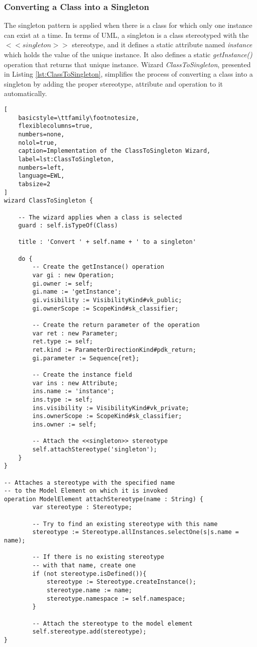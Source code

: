 \subsubsection{Converting a Class into a Singleton}
\label{sec:ClassToSingleton}

The singleton pattern \cite{Larman} is applied when there is a class for which only one instance can exist at a time. In terms of UML, a singleton is a class stereotyped with the $<<singleton>>$ stereotype, and it defines a static attribute named \emph{instance} which holds the value of the unique instance. It also defines a static \emph{getInstance()} operation that returns that unique instance. Wizard \emph{ClassToSingleton}, presented in Listing \ref{lst:ClassToSingleton}, simplifies the process of converting a class into a singleton by adding the proper stereotype, attribute and operation to it automatically.

\begin{lstlisting}[
	basicstyle=\ttfamily\footnotesize, 
	flexiblecolumns=true,
	numbers=none,
	nolol=true,
	caption=Implementation of the ClassToSingleton Wizard, 
	label=lst:ClassToSingleton,
	numbers=left,
	language=EWL,
	tabsize=2
]
wizard ClassToSingleton {
	
	-- The wizard applies when a class is selected
	guard : self.isTypeOf(Class)
	
	title : 'Convert ' + self.name + ' to a singleton'
	
	do {
		-- Create the getInstance() operation 
		var gi : new Operation; 
		gi.owner := self; 
		gi.name := 'getInstance'; 
		gi.visibility := VisibilityKind#vk_public; 
		gi.ownerScope := ScopeKind#sk_classifier; 
		
		-- Create the return parameter of the operation 
		var ret : new Parameter; 
		ret.type := self; 
		ret.kind := ParameterDirectionKind#pdk_return; 
		gi.parameter := Sequence{ret}; 
		
		-- Create the instance field 
		var ins : new Attribute; 
		ins.name := 'instance'; 
		ins.type := self; 
		ins.visibility := VisibilityKind#vk_private; 
		ins.ownerScope := ScopeKind#sk_classifier; 
		ins.owner := self; 
		
		-- Attach the <<singleton>> stereotype 
		self.attachStereotype('singleton');
	}
}

-- Attaches a stereotype with the specified name
-- to the Model Element on which it is invoked
operation ModelElement attachStereotype(name : String) {
		var stereotype : Stereotype;
		
		-- Try to find an existing stereotype with this name
		stereotype := Stereotype.allInstances.selectOne(s|s.name = name);
		
		-- If there is no existing stereotype
		-- with that name, create one
		if (not stereotype.isDefined()){
			stereotype := Stereotype.createInstance();
			stereotype.name := name;
			stereotype.namespace := self.namespace;
		}
		
		-- Attach the stereotype to the model element
		self.stereotype.add(stereotype);
}
\end{lstlisting}

